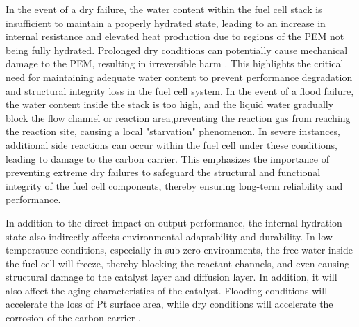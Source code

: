 \par
In the event of a dry failure, the water content within the fuel cell stack is insufficient to maintain a properly hydrated state, leading to an increase in internal resistance and elevated heat production due to regions of the PEM not being fully hydrated.
Prolonged dry conditions can potentially cause mechanical damage to the PEM, resulting in irreversible harm \cite{pattersonDamageCathodeCatalyst2006}.
This highlights the critical need for maintaining adequate water content to prevent performance degradation and structural integrity loss in the fuel cell system.
In the event of a flood failure, the water content inside the stack is too high, and the liquid water gradually block the flow channel or reaction area,preventing the reaction gas from reaching the reaction site, causing a local "starvation" phenomenon\cite{chuExperimentalStudyInfluence2022,ohsModelingHydrogenStarvation2011}.
In severe instances, additional side reactions can occur within the fuel cell under these conditions, leading to damage to the carbon carrier\cite{ohsModelingHydrogenStarvation2011,kuracinaStudySelectedCharacteristics2014,jiaMitigationStrategiesHydrogen2017}. This emphasizes the importance of preventing extreme dry failures to safeguard the structural and functional integrity of the fuel cell components, thereby ensuring long-term reliability and performance.
\par
In addition to the direct impact on output performance, the internal hydration state also indirectly affects environmental adaptability and durability\cite{yuanModelbasedObserversInternal2020,fuFuelCellHumidity2021}. In low temperature conditions, especially in sub-zero environments, the free water inside the fuel cell will freeze, thereby blocking the reactant channels, and even causing structural damage to the catalyst layer and diffusion layer\cite{taccaniEffectFlowField2011,doddsHydrogenFuelCell2015}. In addition, it will also affect the aging characteristics of the catalyst\cite{pattersonDamageCathodeCatalyst2006,sunModelingInfluenceGDL2005}. Flooding conditions will accelerate the loss of Pt surface area, while dry conditions will accelerate the corrosion of the carbon carrier \cite{yousfisteinerDiagnosisPolymerElectrolyte2011,chenOperationCharacteristicsCarbon2015}.
\par

